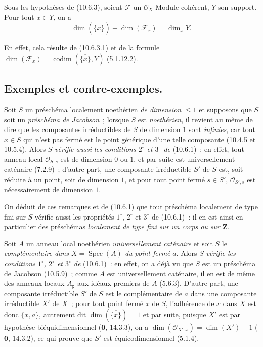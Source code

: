 \begin{corollary}[10.6.4]
\label{IV.10.6.4-fr}
Sous les hypothèses de \textup{(10.6.3)}, soient $\mathcal F$ un $\mathcal O_X$-Module cohérent,
$Y$ son support. Pour tout $x\in Y$, on a
\begin{equation}
\label{IV.10.6.4.1-fr}
\tag{10.6.4.1}
\dim(\overline{\{x\}})+\dim(\mathcal F_x)=\dim_xY.
\end{equation}
\end{corollary}

En effet, cela résulte de (10.6.3.1) et de la formule
$\dim(\mathcal F_x)=\operatorname{codim}(\overline{\{x\}},Y)$ (5.1.12.2).

\subsection{Exemples et contre-exemples.}
\label{subsection:IV.10.7-fr}

\begin{env}[10.7.1]
\label{IV.10.7.1-fr}
Soit $S$ un préschéma localement noethérien \emph{de dimension} $\leq1$ et supposons
que $S$ soit un \emph{préschéma de Jacobson}~; lorsque $S$ est \emph{noethérien}, il
revient au même de dire que les composantes irréductibles de $S$ de dimension
$1$ sont \emph{infinies}, car tout $x\in S$ qui n'est pas fermé est le point générique
d'une telle composante (10.4.5 et 10.5.4). Alors $S$ \emph{vérifie aussi les conditions
$2^\circ$ et $3^\circ$ de} (10.6.1)~: en effet, tout anneau local $\mathcal O_{S,s}$
est de dimension $0$ ou $1$, et par suite est universellement caténaire (7.2.9)~;
d'autre part, une composante irréductible $S'$ de $S$ est, soit réduite
à un point, soit de dimension $1$, et pour tout point fermé $s\in S'$,
$\mathcal O_{S',s}$ est nécessairement de dimension $1$.

On déduit de ces remarques et de (10.6.1) que tout préschéma localement de type
fini sur $S$ vérifie aussi les propriétés $1^\circ$, $2^\circ$ et $3^\circ$ de
(10.6.1)~: il en est ainsi en particulier des préschémas \emph{localement de type
fini sur un corps ou sur $\mathbf Z$}.
\end{env}

\begin{env}[10.7.2]
\label{IV.10.7.2-fr}
Soit $A$ un anneau local noethérien \emph{universellement caténaire} et soit $S$
le \emph{complémentaire dans $X=\operatorname{Spec}(A)$ du point fermé} $a$.
Alors $S$ \emph{vérifie les conditions $1^\circ$, $2^\circ$ et $3^\circ$ de} (10.6.1)~:
en effet, on a déjà vu que $S$ est un préschéma de Jacobson (10.5.9)~; comme $A$
est universellement caténaire, il en est de même des anneaux locaux $A_{\mathfrak p}$
aux idéaux premiers de $A$ (5.6.3). D'autre part, une composante irréductible $S'$
de $S$ est le complémentaire de $a$ dans une composante irréductible $X'$ de $X$~;
pour tout point fermé $x$ de $S$, l'adhérence de $x$ dans $X$ est donc
$\{x,a\}$, autrement dit $\dim(\overline{\{x\}})=1$ et par suite, puisque $X'$
est par hypothèse biéquidimensionnel ($\mathbf 0$, 14.3.3), on a
$\dim(\mathcal O_{X',x})=\dim(X')-1$ ($\mathbf 0$, 14.3.2), ce qui prouve que $S'$
est équicodimensionnel (5.1.4).
\end{env}

